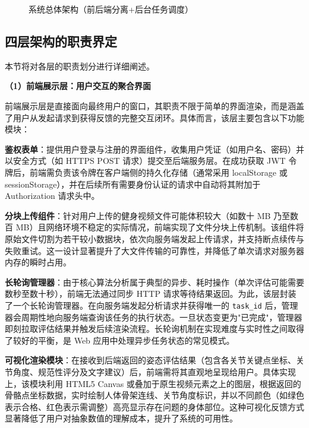 \begin{figure}[H]
  \centering
  \YogaSystemArchitectureTikZ
  \caption{系统总体架构（前后端分离+后台任务调度）}
  \label{fig:overall_arch}
\end{figure}

\subsection{四层架构的职责界定}

本节将对各层的职责划分进行详细阐述。

\textbf{（1）前端展示层：用户交互的聚合界面}

前端展示层是直接面向最终用户的窗口，其职责不限于简单的界面渲染，而是涵盖了用户从发起请求到获得反馈的完整交互闭环。具体而言，该层主要包含以下功能模块：

\begin{chineseenum}
  \item \textbf{鉴权表单}：提供用户登录与注册的界面组件，收集用户凭证（如用户名、密码）并以安全方式（如 HTTPS POST 请求）提交至后端服务层。在成功获取 JWT 令牌后，前端需负责该令牌在客户端侧的持久化存储（通常采用 localStorage 或 sessionStorage），并在后续所有需要身份认证的请求中自动将其附加于 Authorization 请求头中。

  \item \textbf{分块上传组件}：针对用户上传的健身视频文件可能体积较大（如数十 MB 乃至数百 MB）且网络环境不稳定的实际情况，前端实现了文件分块上传机制。该组件将原始文件切割为若干较小数据块，依次向服务端发起上传请求，并支持断点续传与失败重试。这一设计显著提升了大文件传输的可靠性，并降低了单次请求对服务器内存的瞬时占用。

  \item \textbf{长轮询管理器}：由于核心算法分析属于典型的异步、耗时操作（单次评估可能需要数秒至数十秒），前端无法通过同步 HTTP 请求等待结果返回。为此，该层封装了一个长轮询管理器。在向服务端发起分析请求并获得唯一的 \texttt{task\_id} 后，管理器会周期性地向服务端查询该任务的执行状态。一旦状态变更为"已完成"，管理器即刻拉取评估结果并触发后续渲染流程。长轮询机制在实现难度与实时性之间取得了较好的平衡，是 Web 应用中处理异步任务状态的常见模式。

  \item \textbf{可视化渲染模块}：在接收到后端返回的姿态评估结果（包含各关节关键点坐标、关节角度、规范性评分及文字建议）后，前端需将其直观地呈现给用户。具体实现上，该模块利用 HTML5 Canvas 或叠加于原生视频元素之上的图层，根据返回的骨骼点坐标数据，实时绘制人体骨架连线、关节角度标识，并以不同颜色（如绿色表示合格、红色表示需调整）高亮显示存在问题的身体部位。这种可视化反馈方式显著降低了用户对抽象数值的理解成本，提升了系统的可用性。
\end{chineseenum}

